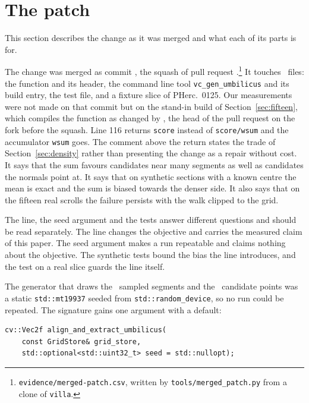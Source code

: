 \section{The patch}
\label{sec:patch}
This section describes the change as it was merged and what each of its parts is for.

The change was merged as commit \texttt{\UpPatchSquashShort}, the squash of pull request
\UpPatchPR.\footnote{\texttt{evidence/merged-patch.csv}, written by \texttt{tools/merged\_patch.py}
from a clone of \texttt{villa}.} It touches \UpSquashFiles\ files: the function and its header, the
command line tool \texttt{vc\_gen\_umbilicus} and its build entry, the test file, and a fixture
slice of PHerc.\ 0125. Our measurements were not made on that commit but on the stand-in build of
Section~\ref{sec:fifteen}, which compiles the function as changed by \texttt{\RevPatchShort}, the
head of the pull request on the fork before the squash. Line 116 returns \texttt{score} instead of \texttt{score/wsum} and the accumulator \texttt{wsum}
goes. The comment above the return states the trade of Section~\ref{sec:density} rather than
presenting the change as a repair without cost. It says that the sum favours candidates near many
segments as well as candidates the normals point at. It says that on synthetic sections with a
known centre the mean is exact and the sum is biased towards the denser side. It also says that on
the fifteen real scrolls the failure persists with the walk clipped to the grid.

The line, the seed argument and the tests answer different questions and should be read
separately. The line changes the objective and carries the measured claim of this paper. The seed
argument makes a run repeatable and claims nothing about the objective. The synthetic tests bound
the bias the line introduces, and the test on a real slice guards the line itself.

The generator that draws the \RevSampleDraws\ sampled segments and the \RevSeedCandidates\
candidate points was a static \texttt{std::mt19937} seeded from \texttt{std::random\_device}, so no
run could be repeated. The signature gains one argument with a default:

\begin{center}
\begin{minipage}{0.93\columnwidth}
\scriptsize
\begin{verbatim}
cv::Vec2f align_and_extract_umbilicus(
    const GridStore& grid_store,
    std::optional<std::uint32_t> seed = std::nullopt);
\end{verbatim}
\end{minipage}
\end{center}

